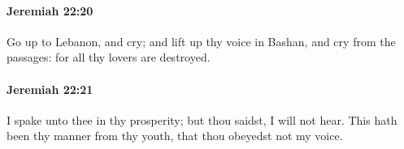 		\paragraph{Jeremiah 22:20} %
			\label{JEREMIAH-22-20}

			Go up to Lebanon, and cry; and lift up thy voice in Bashan, and cry from the passages: for all thy lovers are destroyed.


		\paragraph{Jeremiah 22:21} %
			\label{JEREMIAH-22-21}

			I spake unto thee in thy prosperity; but thou saidst, I will not hear. This hath been thy manner from thy youth, that thou obeyedst not my voice.


